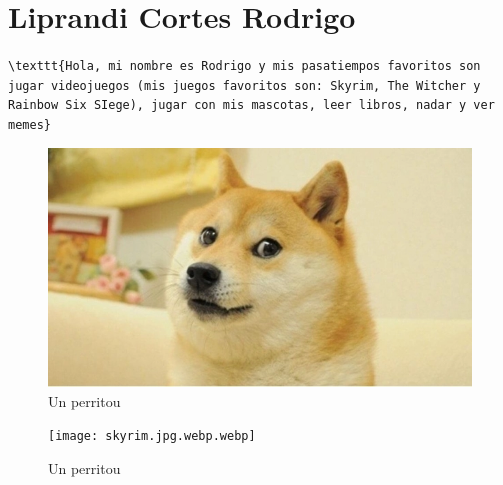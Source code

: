 \chapter{Liprandi Cortes Rodrigo}

\verb!\texttt{Hola, mi nombre es Rodrigo y mis pasatiempos favoritos son jugar videojuegos (mis juegos favoritos son: Skyrim, The Witcher y Rainbow Six SIege), jugar con mis mascotas, leer libros, nadar y ver memes}!\\

\begin{figure}[H] %
  \begin{center}
    \includegraphics[width=450pt]{doge.webp}
    \caption{Un perritou \smiley}
  \end{center}
\end{figure}

\begin{figure}[H] %
  \begin{center}
    \texttt{[image: skyrim.jpg.webp.webp]}
    \caption{Un perritou \smiley}
  \end{center}
\end{figure}

